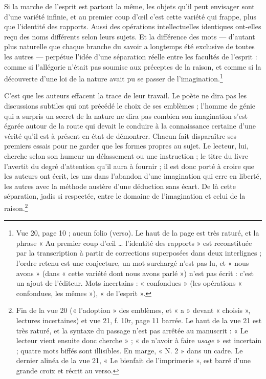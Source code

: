 \documentclass[11pt,a4paper]{article}
\begin{document}
Si la marche de l'esprit est partout la même, les objets qu'il peut envisager
sont d'une variété infinie, et au premier coup d'œil c'est cette variété qui
frappe, plus que l'identité des rapports. Aussi des opérations
intellectuelles identiques ont-elles reçu des noms différents selon leurs
sujets. Et la différence des mots — d'autant plus naturelle que chaque branche
du savoir a longtemps été exclusive de toutes les autres — perpétue l'idée
d'une séparation réelle entre les facultés de l'esprit : comme si l'allégorie
n'était pas soumise aux préceptes de la raison, et comme si la découverte
d'une loi de la nature avait pu se passer de l'imagination.\footnote{Vue 20,
page 10 ; aucun folio (verso). Le haut de la page est très raturé, et la phrase
« Au premier coup d'œil \ldots{} l'identité des rapports » est reconstituée par
la transcription à partir de corrections superposées dans deux interlignes ;
l'ordre retenu est une conjecture, un mot surchargé n'est pas lu, et « nous
avons » (dans « cette variété dont nous avons parlé ») n'est pas écrit : c'est
un ajout de l'éditeur. Mots incertains : « confondues » (les opérations
« confondues, les mêmes »), « de l'esprit ».}

C'est que les auteurs effacent la trace de leur travail. Le poète ne dira pas
les discussions subtiles qui ont précédé le choix de ses emblèmes ; l'homme de
génie qui a surpris un secret de la nature ne dira pas combien son imagination
s'est égarée autour de la route qui devait le conduire à la connaissance
certaine d'une vérité qu'il est à présent en état de démontrer. Chacun fait
disparaître ses premiers essais pour ne garder que les formes propres au sujet.
Le lecteur, lui, cherche selon son humeur un délassement ou une instruction ;
le titre du livre l'avertit du degré d'attention qu'il aura à fournir ; il est
donc porté à croire que les auteurs ont écrit, les uns dans l'abandon d'une
imagination qui erre en liberté, les autres avec la méthode austère d'une
déduction sans écart. De là cette séparation, jadis si respectée, entre le
domaine de l'imagination et celui de la raison.\footnote{Fin de la vue 20
(« l'adoption » des emblèmes, et « a » devant « choisis », lectures incertaines)
et vue 21, f. 10r, page 11 barrée. Le haut de la vue 21 est très raturé, et la
syntaxe du passage n'est pas arrêtée au manuscrit : « Le lecteur vient ensuite
donc cherche » ; « de n'avoir à faire \emph{usage} » est incertain ; quatre
mots biffés sont illisibles. En marge, « N. 2 » dans un cadre. Le dernier
alinéa de la vue 21, « Le bienfait de l'imprimerie », est barré d'une grande
croix et récrit au verso.}
\end{document}
